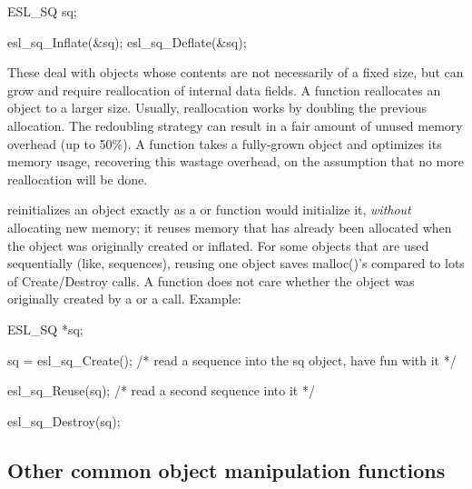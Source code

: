 \begin{sreitems}{}
\begin{cchunk}
ESL_SQ  sq;

esl_sq_Inflate(&sq);
esl_sq_Deflate(&sq);
\end{cchunk}



\item [\ccode{Expand,Squeeze}]
   These deal with objects whose contents are not necessarily of a
   fixed size, but can grow and require reallocation of internal data
   fields. A function  reallocates an
    object to a larger size. Usually, reallocation
   works by doubling the previous allocation. The redoubling strategy
   can result in a fair amount of unused memory overhead (up to
   50\%). A function  takes a fully-grown
   object and optimizes its memory usage, recovering this wastage
   overhead, on the assumption that no more reallocation will be
   done.



\item [\ccode{Reuse}] 
    reinitializes an object exactly as a
    or  function would initialize it, \emph{without}
   allocating new memory; it reuses memory that has
   already been allocated when the object was originally created or
   inflated. For some objects that are used sequentially (like,
   sequences), reusing one object saves malloc()'s compared to
   lots of Create/Destroy calls. A  function does not
   care whether the object was originally created by a 
   or a  call. Example:

\begin{cchunk}
ESL_SQ *sq;

sq = esl_sq_Create();
  /* read a sequence into the sq object, have fun with it */

esl_sq_Reuse(sq);
  /* read a second sequence into it */

esl_sq_Destroy(sq);
\end{cchunk}

\end{sreitems}

\subsection{Other common object manipulation functions}

